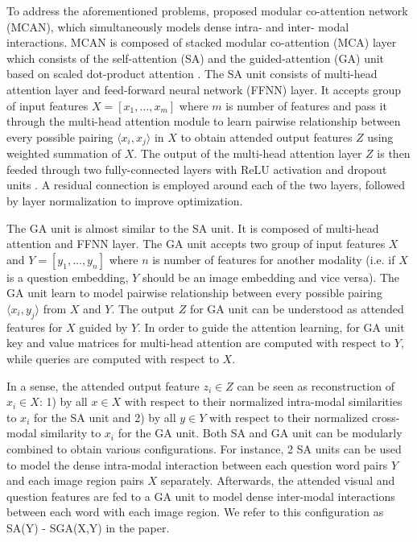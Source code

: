\documentclass{article}
\begin{document}
To address the aforementioned problems, \citet{yu2019mcan} proposed modular co-attention network (MCAN), which simultaneously models dense intra- and inter- modal interactions. MCAN is composed of stacked modular co-attention (MCA) layer which consists of the self-attention (SA) and the guided-attention (GA) unit based on scaled dot-product attention \citep{transformers}. The SA unit consists of multi-head attention layer and feed-forward neural network (FFNN) layer. It accepts group of input features $X = [x_{1}, \dots, x_{m}]$ where $m$ is number of features and pass it through the multi-head attention module to learn pairwise relationship between every possible pairing $\langle x_{i},x_{j} \rangle$ in $X$ to obtain attended output features $Z$ using weighted summation of $X$. The output of the multi-head attention layer $Z$ is then feeded through two fully-connected layers with ReLU activation \citep{relu} and dropout units \citep{dropout}. A residual connection \citep{residual} is employed around each of the two layers, followed by layer normalization \citep{ba2016layer} to improve optimization.

The GA unit is almost similar to the SA unit. It is composed of multi-head attention and FFNN layer. The GA unit accepts two group of input features $X$ and $Y = [y_{1}, \dots, y_{n}]$ where $n$ is number of features for another modality (i.e. if $X$ is a question embedding, $Y$ should be an image embedding and vice versa). The GA unit learn to model pairwise relationship between every possible pairing $\langle x_{i},y_{j} \rangle$ from $X$ and $Y$. The output $Z$ for GA unit can be understood as attended features for $X$ guided by $Y$. In order to guide the attention learning, for GA unit key and value matrices for multi-head attention are computed with respect to $Y$, while queries are computed with respect to $X$. 

In a sense, the attended output feature $z_{i} \in Z$ can be seen as reconstruction of $x_{i} \in X$: 1) by all $x \in X$ with respect to their normalized intra-modal similarities to $x_{i}$ for the SA unit and 2) by all $y \in Y$ with respect to their normalized cross-modal similarity to $x_{i}$ for the GA unit. Both SA and GA unit can be modularly combined to obtain various configurations. For instance, 2 SA units can be used to model the dense intra-modal interaction between each question word pairs $Y$ and each image region pairs $X$ separately. Afterwards, the attended visual and question features are fed to a GA unit to model dense inter-modal interactions between each word with each image region. We refer to this configuration as SA(Y) - SGA(X,Y) in the paper.
\end{document}
